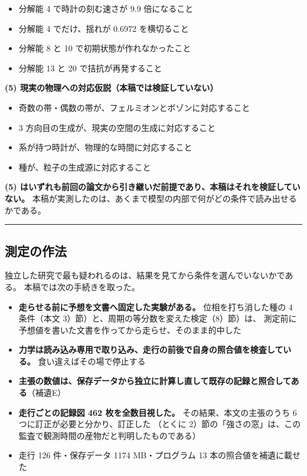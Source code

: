 \documentclass[
]{ltjsarticle}
\providecommand{\tightlist}{%
  \setlength{\itemsep}{0pt}\setlength{\parskip}{0pt}}
\begin{document}
\begin{itemize}
\tightlist
\item
  分解能 4 で時計の刻む速さが 9.9 倍になること
\item
  分解能 4 でだけ、揺れが 0.6972 を横切ること
\item
  分解能 8 と 10 で初期状態が作れなかったこと
\item
  分解能 13 と 20 で拮抗が再発すること
\end{itemize}

\textbf{(5) 現実の物理への対応仮説（本稿では検証していない）}

\begin{itemize}
\tightlist
\item
  奇数の帯・偶数の帯が、フェルミオンとボゾンに対応すること
\item
  3 方向目の生成が、現実の空間の生成に対応すること
\item
  系が持つ時計が、物理的な時間に対応すること
\item
  種が、粒子の生成源に対応すること
\end{itemize}

\textbf{(5)
はいずれも前回の論文から引き継いだ前提であり、本稿はそれを検証していない。}
本稿が実測したのは、あくまで模型の内部で何がどの条件で読み出せるかである。

\begin{center}\rule{0.5\linewidth}{0.5pt}\end{center}

\subsection{測定の作法}\label{ux6e2cux5b9aux306eux4f5cux6cd5}

独立した研究で最も疑われるのは、結果を見てから条件を選んでいないかである。
本稿では次の手続きを取った。

\begin{itemize}
\tightlist
\item
  \textbf{走らせる前に予想を文書へ固定した実験がある。}
  位相を打ち消した種の 4 条件（本文
  3）節）と、周期の等分数を変えた検定（8）節）は、
  測定前に予想値を書いた文書を作ってから走らせ、そのまま的中した
\item
  \textbf{力学は読み込み専用で取り込み、走行の前後で自身の照合値を検査している。}
  食い違えばその場で停止する
\item
  \textbf{主張の数値は、保存データから独立に計算し直して既存の記録と照合してある}（補遺E）
\item
  \textbf{走行ごとの記録図 462 枚を全数目視した。}
  その結果、本文の主張のうち 6 つに訂正が必要と分かり、訂正した （とくに
  2）節の「強さの窓」は、この監査で観測時間の産物だと判明したものである）
\item
  走行 126 件・保存データ 1174 MB・プログラム 13
  本の照合値を補遺に載せた
\end{itemize}
\end{document}
